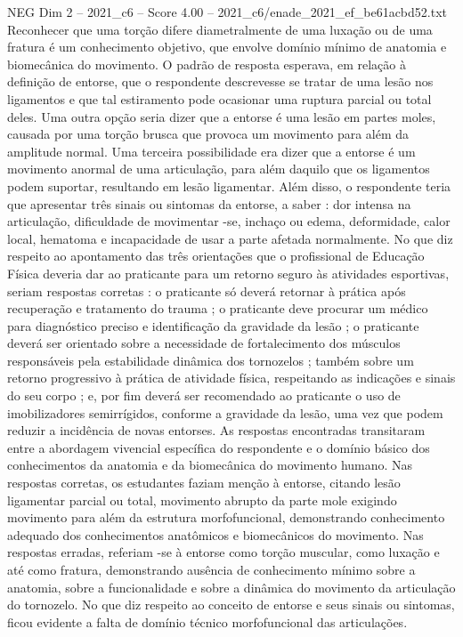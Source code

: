 \begin{textsample}{NEG Dim 2 – 2021\_c6 – Score 4.00 – 2021\_c6/enade\_2021\_ef\_be61acbd52.txt}
Reconhecer que uma torção difere diametralmente de uma luxação ou de uma fratura é um conhecimento objetivo, que envolve domínio mínimo de anatomia e biomecânica do movimento.
O padrão de resposta esperava, em relação à definição de entorse, que o respondente descrevesse se tratar de uma lesão nos ligamentos e que tal estiramento pode ocasionar uma ruptura parcial ou total deles.
Uma outra opção seria dizer que a entorse é uma lesão em partes moles, causada por uma torção brusca que provoca um movimento para além da amplitude normal.
Uma terceira possibilidade era dizer que a entorse é um movimento anormal de uma articulação, para além daquilo que os ligamentos podem suportar, resultando em lesão ligamentar.
Além disso, o respondente teria que apresentar três sinais ou sintomas da entorse, a saber : dor intensa na articulação, dificuldade de movimentar -se, inchaço ou edema, deformidade, calor local, hematoma e incapacidade de usar a parte afetada normalmente.
No que diz respeito ao apontamento das três orientações que o profissional de Educação Física deveria dar ao praticante para um retorno seguro às atividades esportivas, seriam respostas corretas : o praticante só deverá retornar à prática após recuperação e tratamento do trauma ; o praticante deve procurar um médico para diagnóstico preciso e identificação da gravidade da lesão ; o praticante deverá ser orientado sobre a necessidade de fortalecimento dos músculos responsáveis pela estabilidade dinâmica dos tornozelos ; também sobre um retorno progressivo à prática de atividade física, respeitando as indicações e sinais do seu corpo ; e, por fim deverá ser recomendado ao praticante o uso de imobilizadores semirrígidos, conforme a gravidade da lesão, uma vez que podem reduzir a incidência de novas entorses.
As respostas encontradas transitaram entre a abordagem vivencial específica do respondente e o domínio básico dos conhecimentos da anatomia e da biomecânica do movimento humano.
Nas respostas corretas, os estudantes faziam menção à entorse, citando lesão ligamentar parcial ou total, movimento abrupto da parte mole exigindo movimento para além da estrutura morfofuncional, demonstrando conhecimento adequado dos conhecimentos anatômicos e biomecânicos do movimento.
Nas respostas erradas, referiam -se à entorse como torção muscular, como luxação e até como fratura, demonstrando ausência de conhecimento mínimo sobre a anatomia, sobre a funcionalidade e sobre a dinâmica do movimento da articulação do tornozelo.
No que diz respeito ao conceito de entorse e seus sinais ou sintomas, ficou evidente a falta de domínio técnico morfofuncional das articulações.

\end{textsample}
